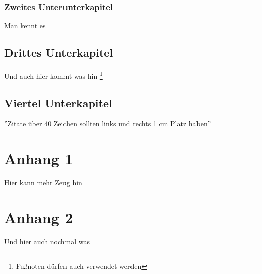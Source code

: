\documentclass[11pt,a4paper]{scrreprt}
\begin{document}
\subsection{Zweites Unterunterkapitel}
Man kennt es

\section{Drittes Unterkapitel}
Und auch hier kommt was hin \footnote{Fußnoten dürfen auch verwendet werden}

\section{Viertel Unterkapitel}
''Zitate über 40 Zeichen sollten links und rechts 1 cm Platz haben''

\appendix
\chapter{Anhang 1}
Hier kann mehr Zeug hin

\chapter{Anhang 2}
Und hier auch nochmal was
\end{document}

